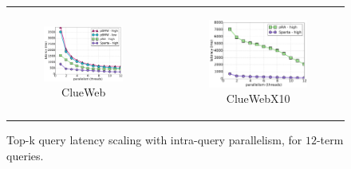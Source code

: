 \begin{figure}[tbh]
\centering
\begin{tabular}{ccc}
      \begin{subfigure}[t]{0.33\textwidth}
         \includegraphics[width=\textwidth]{figures/latency_12terms_clueweb.pdf}
        \caption[]{ClueWeb}
      \end{subfigure} 
& 
	\hspace{0.1\textwidth}
& 
      \begin{subfigure}[t]{0.33\textwidth}
      \includegraphics[width=\textwidth]{figures/latency_12terms_cluewebX10.pdf}
	  \caption{ClueWebX10}
      \end{subfigure}
\end{tabular}
\caption{Top-k query latency scaling with intra-query parallelism, for $12$-term queries.}
\label{fig:threads-scaling}
\end{figure}

